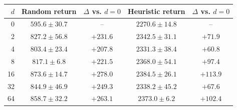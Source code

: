 \begin{tabular}{rcccc}
\toprule
\(d\) & Random return & \(\Delta\) vs. \(d=0\) & Heuristic return & \(\Delta\) vs. \(d=0\) \\
\midrule
0 & \(595.6 \pm 30.7\) & -- & \(2270.6 \pm 14.8\) & -- \\
2 & \(827.2 \pm 56.8\) & \(+231.6\) & \(2342.5 \pm 31.1\) & \(+71.9\) \\
4 & \(803.4 \pm 23.4\) & \(+207.8\) & \(2331.3 \pm 38.4\) & \(+60.8\) \\
8 & \(817.1 \pm 6.8\) & \(+221.5\) & \(2368.0 \pm 54.1\) & \(+97.4\) \\
16 & \(\mathbf{873.6 \pm 14.7}\) & \(+278.0\) & \(\mathbf{2384.5 \pm 26.1}\) & \(+113.9\) \\
32 & \(844.9 \pm 46.9\) & \(+249.3\) & \(2338.2 \pm 45.2\) & \(+67.6\) \\
64 & \(858.7 \pm 32.2\) & \(+263.1\) & \(2373.0 \pm 6.2\) & \(+102.4\) \\
\bottomrule
\end{tabular}
